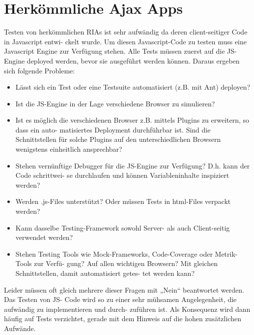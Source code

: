 \documentclass[a4paper,10pt]{scrreprt}
\begin{document}
\section{Herkömmliche Ajax Apps}
Testen von herkömmlichen RIAs ist sehr aufwändig da deren client-seitiger Code in Javascript entwi-
ckelt wurde. Um diesen Javascript-Code zu testen muss eine Javascript Engine zur Verfügung stehen.
Alle Tests müssen zuerst auf die JS-Engine deployed werden, bevor sie ausgeführt werden können.
Daraus ergeben sich folgende Probleme:
\begin{itemize}
\item Lässt sich ein Test oder eine Testsuite automatisiert (z.B. mit Ant) deployen?
\item Ist die JS-Engine in der Lage verschiedene Browser zu simulieren?
\item Ist es möglich die verschiedenen Browser z.B. mittels Plugins zu erweitern, so dass ein auto-
matisiertes Deployment durchführbar ist. Sind die Schnittstellen für solche Plugins auf den
unterschiedlichen Browsern wenigstens einheitlich ansprechbar?
\item Stehen vernünftige Debugger für die JS-Engine zur Verfügung? D.h. kann der Code schrittwei-
se durchlaufen und können Variableninhalte inspiziert werden?
\item Werden .js-Files unterstützt? Oder müssen Tests in html-Files verpackt werden?
\item Kann dasselbe Testing-Framework sowohl Server- als auch Client-seitig verwendet werden?
\item Stehen Testing Tools wie Mock-Frameworks, Code-Coverage oder Metrik-Tools zur Verfü-
gung? Auf allen wichtigen Browsern? Mit gleichen Schnittstellen, damit automatisiert getes-
tet werden kann?

\end{itemize}
Leider müssen oft gleich mehrere dieser Fragen mit „Nein“ beantwortet werden. Das Testen von JS-
Code wird so zu einer sehr mühsamen Angelegenheit, die aufwändig zu implementieren und durch-
zuführen ist. Als Konsequenz wird dann häufig auf Tests verzichtet, gerade mit dem Hinweis auf die
hohen zusätzlichen Aufwände.
\end{document}

